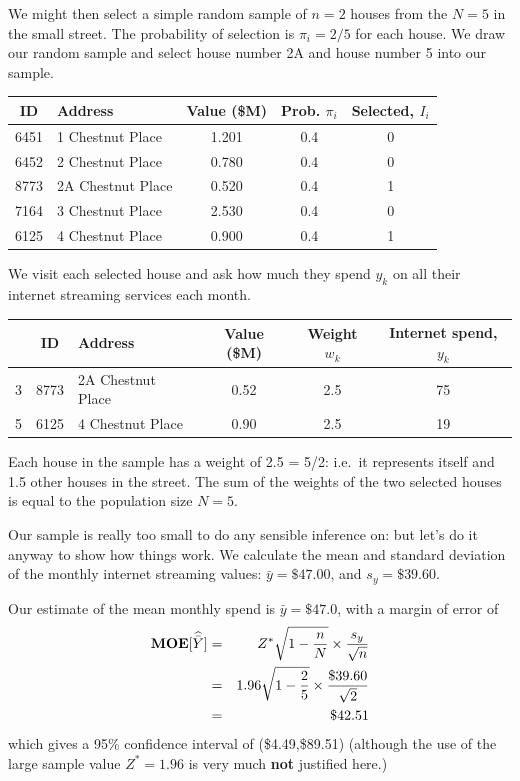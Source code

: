 \documentclass[
]{book}
\newcommand{\bfa}[2]{{\rm\bf #1}[#2]}
\begin{document}
We might then select a simple random sample of \(n=2\) houses
from the \(N=5\) in the small street. The probability of selection is \(\pi_i=2/5\)
for each house. We draw our random sample and select house number 2A and
house number 5 into our sample.

\begin{table}
\centering
\begin{tabular}[t]{c|l|c|c|c}
\hline
ID & Address & Value (\$M) & Prob. $\pi_i$ & Selected, $I_i$\\
\hline
6451 & 1 Chestnut Place & 1.201 & 0.4 & 0\\
\hline
6452 & 2 Chestnut Place & 0.780 & 0.4 & 0\\
\hline
8773 & 2A Chestnut Place & 0.520 & 0.4 & 1\\
\hline
7164 & 3 Chestnut Place & 2.530 & 0.4 & 0\\
\hline
6125 & 4 Chestnut Place & 0.900 & 0.4 & 1\\
\hline
\end{tabular}
\end{table}

We visit each selected house and ask how much they spend \(y_k\) on all their internet streaming
services each month.

\begin{table}
\centering
\begin{tabular}[t]{l|c|l|c|c|c}
\hline
  & ID & Address & Value (\$M) & Weight $w_k$ & Internet spend, $y_k$\\
\hline
3 & 8773 & 2A Chestnut Place & 0.52 & 2.5 & 75\\
\hline
5 & 6125 & 4 Chestnut Place & 0.90 & 2.5 & 19\\
\hline
\end{tabular}
\end{table}

Each house in the sample has a weight of 2.5 = 5/2: i.e.~it represents itself and 1.5 other houses
in the street. The sum of the weights of the two selected houses is equal to the population size
\(N=5\).

Our sample is really too small to do any sensible inference on: but let's do it anyway to show how things
work. We calculate the mean and standard deviation of the monthly internet streaming values:
\(\bar{y}=\$47.00\), and \(s_y=\$39.60\).

Our estimate of the mean monthly spend is \(\bar{y}=\$47.0\), with a margin of error of
\begin{eqnarray}
   \bfa{MOE}{\widehat{\bar{Y}}} 
   &=& Z^\ast\sqrt{1-\frac{n}{N}}\times\frac{s_y}{\sqrt{n}}\\
   &=& 1.96\sqrt{1-\frac{2}{5}}\times\frac{\$39.60}{\sqrt{2}}\\
   &=& \$42.51
\end{eqnarray}
which gives a 95\% confidence interval of (\$4.49,\$89.51) (although
the use of the large sample value \(Z^\ast=1.96\) is very much \textbf{not} justified here.)
\end{document}
